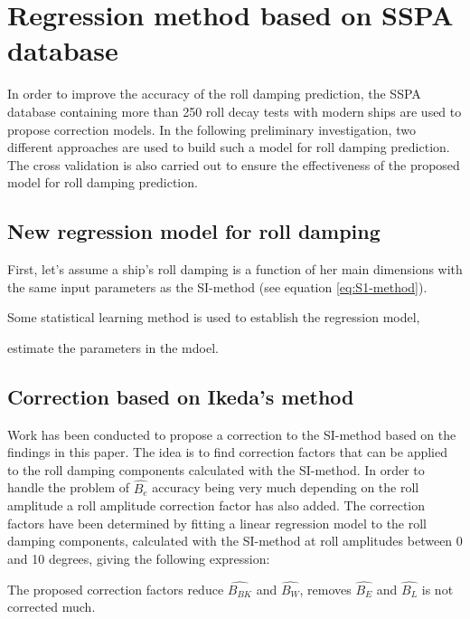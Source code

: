 \section{Regression method based on SSPA database}
\label{se:correction_SI_method}
In order to improve the accuracy of the roll damping prediction, the SSPA database containing more than 250 roll decay tests with modern ships are used to propose correction models. In the following preliminary investigation, two different approaches are used to build such a model for roll damping prediction. The cross validation is also carried out to ensure the effectiveness of the proposed model for roll damping prediction.

\subsection{New regression model for roll damping}
First, let's assume a ship's roll damping is a function of her main dimensions with the same input parameters as the SI-method (see equation \ref{eq:S1-method}). 


Some statistical learning method is used to establish the regression model, 

estimate the parameters in the mdoel. 

\subsection{Correction based on Ikeda's method}
Work has been conducted to propose a correction to the SI-method based on the findings in this paper. The idea is to find correction factors that can be applied to the roll damping components calculated with the SI-method. In order to handle the problem of $\hat{B_e}$ accuracy being very much depending on the roll amplitude a roll amplitude correction factor has also added. The correction factors have been determined by fitting a linear regression model to the roll damping components, calculated with the SI-method at roll amplitudes between 0 and 10 degrees, giving the following expression: 

The proposed correction factors reduce $\hat{B_{BK}}$ and $\hat{B_{W}}$, removes $\hat{B_{E}}$ and $\hat{B_{L}}$ is not corrected much.


